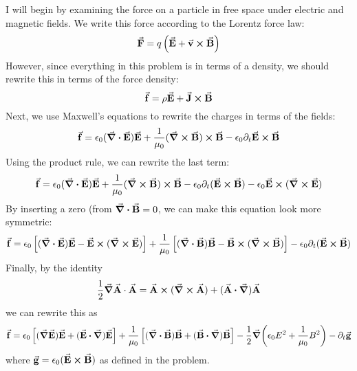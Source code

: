 \documentclass[a4paper,twoside]{article}
\begin{document}
\begin{problem}
    I will begin by examining the force on a particle in free space under electric and magnetic fields. We write this force according to the Lorentz force law:
    \begin{equation}
        \va{F} = q \left( \va{E} + \va{v} \cross \va{B} \right)
    \end{equation}
    However, since everything in this problem is in terms of a density, we should rewrite this in terms of the force density:
    \begin{equation}
        \va{f} = \rho \va{E} + \va{J} \cross \va{B}
    \end{equation}
    Next, we use Maxwell's equations to rewrite the charges in terms of the fields:
    \begin{equation}
        \va{f} = \epsilon_0 (\div{ \va{E}}) \va{E} + \frac{1}{\mu_0} (\curl{ \va{B}}) \cross \va{B} - \epsilon_0 \partial_t \va{E} \cross \va{B}
    \end{equation}
    Using the product rule, we can rewrite the last term:
    \begin{equation}
        \va{f} = \epsilon_0 (\div{ \va{E}}) \va{E} + \frac{1}{\mu_0} (\curl{ \va{B}}) \cross \va{B} - \epsilon_0 \partial_t (\va{E} \cross \va{B}) - \epsilon_0 \va{E} \cross (\curl{ \va{E}})
    \end{equation}
    By inserting a zero (from $ \div{ \va{B}} = 0 $, we can make this equation look more symmetric:
        \begin{equation}
            \va{f} = \epsilon_0 \left[ (\div{ \va{E}}) \va{E} - \va{E} \cross (\curl{ \va{E}}) \right] + \frac{1}{\mu_0} \left[ (\div{ \va{B}}) \va{B} - \va{B} \cross (\curl{ \va{B}}) \right] - \epsilon_0 \partial_t (\va{E} \cross \va{B})
        \end{equation}
        Finally, by the identity
        \begin{equation}
            \frac{1}{2} \grad{ \va{A} \cdot \va{A}} = \va{A} \cross (\curl{ \va{A}}) + (\va{A} \vdot \grad) \va{A}
        \end{equation}
        we can rewrite this as
        \begin{equation}
            \va{f} = \epsilon_0 \left[ (\grad{ \va{E}}) \va{E} + (\va{E} \vdot \grad) \va{E} \right] + \frac{1}{\mu_0} \left[ (\div{ \va{B}}) \va{B} + (\va{B} \vdot \grad) \va{B} \right] - \frac{1}{2} \grad(\epsilon_0 E^2 + \frac{1}{\mu_0} B^2) - \partial_t \va{g}
        \end{equation}
        where $ \va{g} = \epsilon_0 (\va{E} \cross \va{B}) $ as defined in the problem.


\end{problem}
\end{document}
